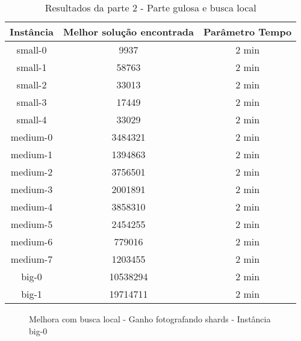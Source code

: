 \documentclass[11pt,letterpaper]{article}
\begin{document}
\begin{table}[h!]
  \begin{centering}
    \begin{tabular}{|c|c|c|}
      \hline 
      Instância & Melhor solução encontrada & Parâmetro Tempo  \tabularnewline
      \hline 
      \hline 
      small-0 & 9937 & 2 min  \tabularnewline %
      \hline 
      small-1 & 58763 & 2 min  \tabularnewline %
      \hline 
      small-2 & 33013 & 2 min  \tabularnewline %
      \hline 
      small-3 & 17449 & 2 min  \tabularnewline %
      \hline 
      small-4 & 33029 & 2 min  \tabularnewline %
      \hline 
      medium-0 &  3484321 & 2 min  \tabularnewline %
      \hline 
      medium-1 & 1394863 & 2 min  \tabularnewline %
      \hline 
      medium-2 & 3756501 & 2 min  \tabularnewline %
      \hline 
      medium-3 & 2001891 & 2 min  \tabularnewline %
      \hline 
      medium-4 & 3858310 & 2 min  \tabularnewline %
      \hline 
      medium-5 & 2454255 & 2 min  \tabularnewline %
      \hline 
      medium-6 & 779016 & 2 min  \tabularnewline %
      \hline 
      medium-7 & 1203455 & 2 min  \tabularnewline %
      \hline 
      big-0 & 10538294 & 2 min  \tabularnewline %
      \hline 
      big-1 & 19714711 & 2 min  \tabularnewline %
      \hline 

    \end{tabular}
    \par\end{centering}
  \caption{Resultados da parte 2 - Parte gulosa e busca local}
  \label{tab:loc}
\end{table}

\newpage

\begin{figure}[h!]
  \begin{center}
  \end{center}
  \caption{Melhora com busca local - Ganho fotografando shards -
    Instância big-0}
  \label{graf:big}
\end{figure}
\end{document}

